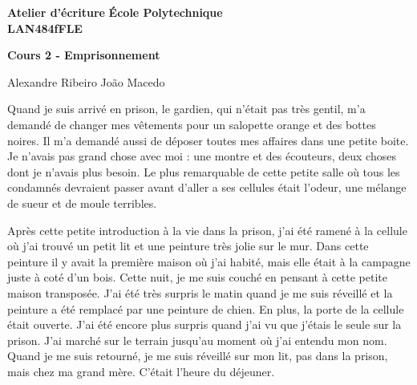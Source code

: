 \documentclass[10pt]{article} %
\newcommand{\createHeader}[6]{
	\noindent
	\normalsize\textbf{#2} \hfill \textbf{#1}\\
	\normalsize\textbf{#3} \hfill \textbf{\displaydate{#6}}\vspace{20pt}
	\centerline{\Large \textbf{#5}}\vspace{3pt}
	\centerline{\normalsize #4}\vspace{20pt}}
\begin{document}
	\createHeader{École Polytechnique}{Atelier d'écriture}{LAN484fFLE}{Alexandre Ribeiro João Macedo}{Cours 2 - Emprisonnement}{date}
	
Quand je suis arrivé en prison, le gardien, qui n'était pas très gentil, m'a demandé de changer mes vêtements pour un salopette orange et des bottes noires. Il m'a demandé aussi de déposer toutes mes affaires dans une petite boite. Je n'avais pas grand chose avec moi : une montre et des écouteurs, deux choses dont je n’avais plus besoin. Le plus remarquable de cette petite salle où tous les condamnés devraient passer avant d'aller a ses cellules était l'odeur, une mélange de sueur et de moule terribles.

Après cette petite introduction à la vie dans la prison, j'ai été ramené à la cellule où j'ai trouvé un petit lit et une peinture très jolie sur le mur. Dans cette peinture il y avait la première maison où j'ai habité, mais elle était à la campagne juste à coté d’un bois. Cette nuit, je me suis couché en pensant à cette petite maison transposée. J'ai été très surpris le matin quand je me suis réveillé et la peinture a été remplacé par une peinture de chien. En plus, la porte de la cellule était ouverte. J'ai été encore plus surpris quand j'ai vu que j'étais le seule sur la prison. J'ai marché sur le terrain jusqu'au moment où j'ai entendu mon nom. Quand je me suis retourné, je me suis réveillé sur mon lit, pas dans la prison, mais chez ma grand mère. C'était l'heure du déjeuner.   
\end{document}
